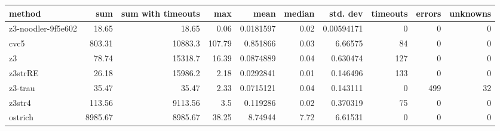 \begin{tabular}{lrrrrrrrrr}
\hline
 method             &     sum &   sum with timeouts &    max &      mean &   median &   std. dev &   timeouts &   errors &   unknowns \\
\hline
 z3-noodler-9f5e602 &   18.65 &               18.65 &   0.06 & 0.0181597 &     0.02 & 0.00594171 &          0 &        0 &          0 \\
 cvc5               &  803.31 &            10883.3  & 107.79 & 0.851866  &     0.03 & 6.66575    &         84 &        0 &          0 \\
 z3                 &   78.74 &            15318.7  &  16.39 & 0.0874889 &     0.04 & 0.630474   &        127 &        0 &          0 \\
 z3strRE            &   26.18 &            15986.2  &   2.18 & 0.0292841 &     0.01 & 0.146496   &        133 &        0 &          0 \\
 z3-trau            &   35.47 &               35.47 &   2.33 & 0.0715121 &     0.04 & 0.143111   &          0 &      499 &         32 \\
 z3str4             &  113.56 &             9113.56 &   3.5  & 0.119286  &     0.02 & 0.370319   &         75 &        0 &          0 \\
 ostrich            & 8985.67 &             8985.67 &  38.25 & 8.74944   &     7.72 & 6.61531    &          0 &        0 &          0 \\
\hline
\end{tabular}
